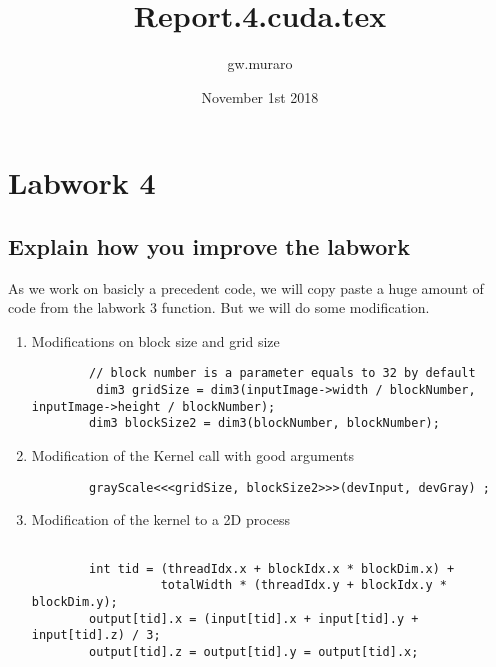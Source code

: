 \documentclass{article}
\title{Report.4.cuda.tex}
\author{gw.muraro}
\date{November 1st 2018}
\begin{document}
\maketitle
\section{Labwork 4}
\subsection{Explain how you improve the labwork}

    As we work on basicly a precedent code, we will copy paste a huge amount of code from the labwork 3 function. But we will do some modification. 
    
    
    \begin{enumerate}

    \item Modifications on block size and grid size
    \begin{verbatim}
        // block number is a parameter equals to 32 by default
         dim3 gridSize = dim3(inputImage->width / blockNumber, inputImage->height / blockNumber);
        dim3 blockSize2 = dim3(blockNumber, blockNumber);
    \end{verbatim}

    \item Modification of the Kernel call with good arguments 
    \begin{verbatim}
        grayScale<<<gridSize, blockSize2>>>(devInput, devGray) ;    
    \end{verbatim}

    \item Modification of the kernel to a 2D process
    \begin{verbatim}
        
        int tid = (threadIdx.x + blockIdx.x * blockDim.x) + 
                  totalWidth * (threadIdx.y + blockIdx.y * blockDim.y);
        output[tid].x = (input[tid].x + input[tid].y + input[tid].z) / 3;
        output[tid].z = output[tid].y = output[tid].x;

    \end{verbatim}

    \end{enumerate}    
\end{document}
